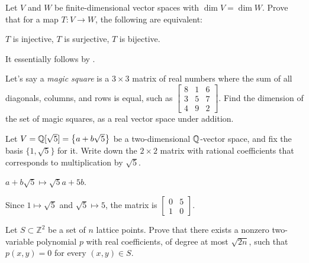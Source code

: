 \begin{dproblem}
	\label{prob:equal_dimension}
	Let $V$ and $W$ be finite-dimensional vector
	spaces with $\dim V = \dim W$.
	Prove that for a map $T \colon V \to W$,
	the following are equivalent:
	\begin{itemize}
		\ii $T$ is injective,
		\ii $T$ is surjective,
		\ii $T$ is bijective.
	\end{itemize}
	\begin{sol}
		It essentially follows by .
	\end{sol}
\end{dproblem}

\begin{problem}
	Let's say a \emph{magic square} is a $3 \times 3$ matrix of real numbers
	where the sum of all diagonals, columns, and rows is equal, such as
	$\left[ \begin{smallmatrix}
		8 & 1 & 6 \\
		3 & 5 & 7 \\
		4 & 9 & 2
	\end{smallmatrix} \right]$.
	Find the dimension of the set of magic squares, as a real vector space under addition.
\end{problem}

\begin{problem}
	Let $V = \mathbb Q[\sqrt5] = \left\{ a + b \sqrt 5 \right\}$
	be a two-dimensional $\mathbb Q$-vector space,
	and fix the basis $\{1, \sqrt 5\}$ for it.
	Write down the $2 \times 2$ matrix with rational coefficients
	that corresponds to multiplication by $\sqrt 5$.
	\begin{hint}
		$a + b \sqrt 5 \mapsto \sqrt 5 a + 5b$.
	\end{hint}
	\begin{sol}
		Since $1 \mapsto \sqrt5$ and $\sqrt5 \mapsto 5$,
		the matrix is
		$\begin{bmatrix}
			0 & 5 \\
			1 & 0
		\end{bmatrix}$.
	\end{sol}
\end{problem}

\begin{problem}
	Let $S \subset {\mathbb Z}^2$ be a set of $n$ lattice points.
	Prove that there exists a nonzero two-variable polynomial $p$
	with real coefficients, of degree at most $\sqrt{2n}$,
	such that $p(x,y) = 0$ for every $(x,y) \in S$.
\end{problem}

